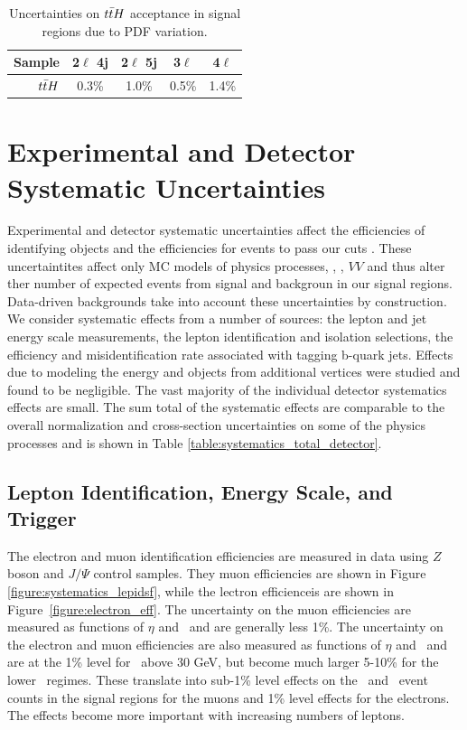 \begin{table}
\begin{center}
\caption{\label{table:systematics_pdfaccttH}Uncertainties on $t\bar{t} H$ acceptance in signal
  regions due to PDF variation.}
\begin{tabular}{r|c|c|c|c}
Sample & 2$\ell$ 4j & 2$\ell$ 5j & 3$\ell$ & 4$\ell$\\
\hline
$t\bar{t} H$ & 0.3\% & 1.0\% & 0.5\% & 1.4\%\\
\end{tabular}
\end{center}
\end{table}



\section{Experimental and Detector Systematic Uncertainties}
 
Experimental and detector systematic uncertainties affect the efficiencies of identifying objects and the efficiencies for events to pass our cuts . These uncertaintites affect only MC models of physics processes, \ttV, \tth, $VV$ and thus alter ther number of expected events from signal and backgroun in our signal regions. Data-driven backgrounds take into account these uncertainties by construction. We consider systematic effects from a number of sources: the lepton and jet energy scale measurements, the lepton identification and isolation selections, the efficiency and misidentification rate associated with tagging b-quark jets. Effects due to modeling the energy and objects from additional vertices were studied and found to be negligible. The vast majority of the individual detector systematics effects are small. The sum total of the systematic effects are comparable to the overall normalization and cross-section uncertainties on some of the physics processes and is shown in Table \ref{table:systematics_total_detector}.

\subsection{Lepton Identification, Energy Scale, and Trigger}
The electron\cite{ATLAS-CONF-2014-032} and muon identification efficiencies\cite{MuonSF} are measured in data using $Z$ boson and $J/\Psi$ control samples. They muon efficiencies are shown in Figure \ref{figure:systematics_lepidsf}, while the lectron efficienceis are shown in Figure~\ref{figure:electron_eff}. The uncertainty on the muon efficiencies are measured as functions of $\eta$ and \pt\ and are generally less 1\%. The uncertainty on the electron and muon efficiencies are also measured as functions of $\eta$ and \pt\ and are at the 1\% level for \pt\ above 30 GeV, but become much larger 5-10\% for the lower \pt\ regimes.   These translate into sub-1\% level effects on the \ttV\ and \tth\ event counts in the signal regions for the muons and 1\% level effects for the electrons. The effects become more important with increasing numbers of leptons.  

